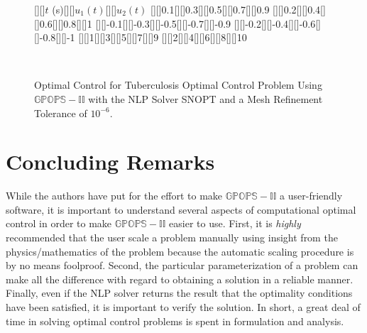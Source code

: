 \documentclass[10pt]{article}
\begin{document}
\begin{figure}[h]
\psfragscanon
{}[][]{$t$ (s)}[][]{$u_1(t)$}[][]{$u_2(t)$}
[][]{\footnotesize 0.1}[][]{\footnotesize 0.3}[][]{\footnotesize 0.5}[][]{\footnotesize 0.7}[][]{\footnotesize 0.9}
[][]{\footnotesize 0.2}[][]{\footnotesize 0.4}[][]{\footnotesize 0.6}[][]{\footnotesize 0.8}[][]{\footnotesize 1}
[][]{\footnotesize -0.1}[][]{\footnotesize -0.3}[][]{\footnotesize -0.5}[][]{\footnotesize -0.7}[][]{\footnotesize -0.9}
[][]{\footnotesize -0.2}[][]{\footnotesize -0.4}[][]{\footnotesize -0.6}[][]{\footnotesize -0.8}[][]{\footnotesize -1}
[][]{\footnotesize 1}[][]{\footnotesize 3}[][]{\footnotesize 5}[][]{\footnotesize 7}[][]{\footnotesize 9}
[][]{\footnotesize 2}[][]{\footnotesize 4}[][]{\footnotesize 6}[][]{\footnotesize 8}[][]{\footnotesize 10}
\centering

\hspace*{-0.5in}~~~

   \caption{Optimal Control for Tuberculosis Optimal Control Problem Using $\mathbb{GPOPS-II}$ with the NLP Solver SNOPT and a Mesh  Refinement Tolerance of $10^{-6}$. \label{fig:tuberculosisControl}}
\end{figure}

\clearpage

\section{Concluding Remarks}

While the authors have put for the effort to make $\mathbb{GPOPS-II}$ a
user-friendly software, it is important to understand several aspects
of computational optimal control in order to make $\mathbb{GPOPS-II}$ easier to
use.  First, it is {\em highly} recommended that the user scale a
problem manually using insight from the physics/mathematics of the
problem because the automatic scaling procedure is by no means
foolproof.  Second, the particular parameterization of a problem can
make all the difference with regard to obtaining a solution in a
reliable manner.  Finally, even if the NLP solver returns the result that the
optimality conditions have been satisfied, it is important to verify
the solution.  In short, a great deal of time in solving optimal
control problems is spent in formulation and analysis.



\end{document}
